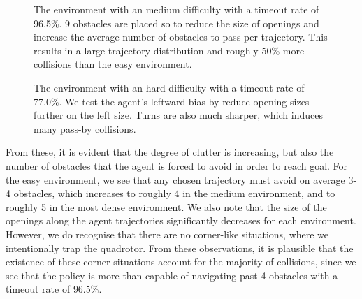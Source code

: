 \begin{figure}[!htbp]
    \centering
    \caption{The environment with an medium difficulty with a timeout rate of 96.5\%. 9 obstacles are placed so to reduce the size of openings and increase the average number of obstacles to pass per trajectory. This results in a large trajectory distribution and roughly 50\% more collisions than the easy environment.}
    \label{fig:7_medium}
    \caption{The environment with an hard difficulty with a timeout rate of 77.0\%. We test the agent's leftward bias by reduce opening sizes further on the left size. Turns are also much sharper, which induces many pass-by collisions.}    
    \label{fig:7_hard}
\end{figure}

From these, it is evident that the degree of clutter is increasing, but also the number of obstacles that the agent is forced to avoid in order to reach goal. For the easy environment, we see that any chosen trajectory must avoid on average 3-4 obstacles, which increases to roughly 4 in the medium environment, and to roughly 5 in the most dense environment. We also note that the size of the openings along the agent trajectories significantly decreases for each environment.
However, we do recognise that there are no corner-like situations, where we intentionally trap the quadrotor.
From these observations, it is plausible that the existence of these corner-situations account for the majority of collisions, since we see that the policy is more than capable of navigating past 4 obstacles with a timeout rate of $96.5\%$.

